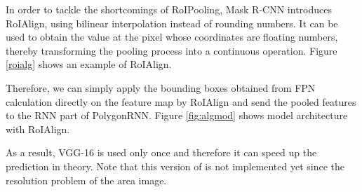 In order to tackle the shortcomings of RoIPooling, Mask R-CNN introduces RoIAlign, using bilinear interpolation instead of rounding numbers. It can be used to obtain the value at the pixel whose coordinates are floating numbers, thereby transforming the pooling process into a continuous operation. Figure \ref{roialg} shows an example of RoIAlign.



Therefore, we can simply apply the bounding boxes obtained from FPN calculation directly on the feature map by RoIAlign and send the pooled features to the RNN part of PolygonRNN. Figure \ref{fig:algmod} shows \modelnameshort model architecture with RoIAlign.



As a result, VGG-16 is used only once and therefore it can speed up the prediction in theory. Note that this version of \modelnameshort is not implemented yet since the resolution problem of the area image.


